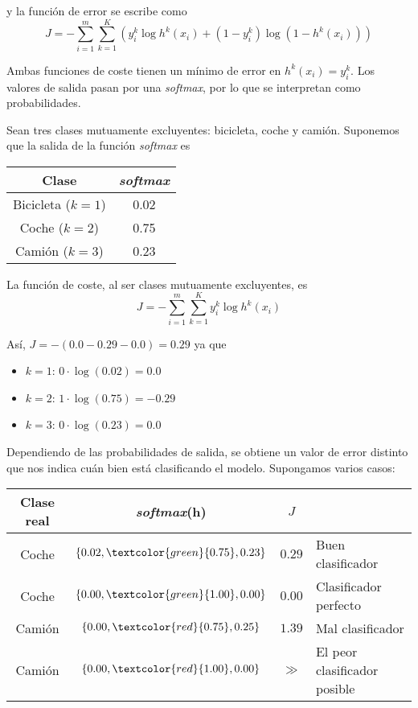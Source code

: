 \noindent y la función de error se escribe como 
\begin{equation}
J = -\sum_{i = 1}^m \sum_{k = 1}^K \left(y_i^k \log h^k(x_i) + (1 - y_i^k) \log (1 - h^k(x_i))\right)
\end{equation}

Ambas funciones de coste tienen un mínimo de error en $h^k(x_i) = y_i^k$. Los valores de salida pasan por una \textit{softmax}, por lo que se interpretan como probabilidades.

\begin{example}
Sean tres clases mutuamente excluyentes: bicicleta, coche y camión. Suponemos que la salida de la función \textit{softmax} es 
\begin{table}[H]
\centering
\begin{tabular}{cc}
\hline \hline
Clase & \textit{softmax} \\ \hline \hline
Bicicleta ($k = 1$) & 0.02 \\
Coche ($k = 2$) & 0.75 \\
Camión ($k = 3$) & 0.23 \\ \hline
\end{tabular}
\end{table}

\noindent La función de coste, al ser clases mutuamente excluyentes, es
\begin{equation}
J = -\sum_{i = 1}^m \sum_{k = 1}^K y_i^k \log h^k(x_i)
\end{equation}

\noindent Así, $J = - (0.0 - 0.29 - 0.0) = 0.29$ ya que  
\begin{itemize}
\item $k = 1$: $0 \cdot \log (0.02) = 0.0$
\item $k = 2$: $1 \cdot \log (0.75) = -0.29$
\item $k = 3$: $0 \cdot \log (0.23) = 0.0$
\end{itemize}

Dependiendo de las probabilidades de salida, se obtiene un valor de error distinto que nos indica cuán bien está clasificando el modelo. Supongamos varios casos:
\begin{table}[H]
\centering
\begin{tabular}{cccl}
\hline \hline
Clase real & \textit{softmax}(h) & $J$ &  \\ \hline \hline
Coche & $\{0.02, \textcolor{green}{0.75}, 0.23\}$ & $0.29$ & Buen clasificador \\
Coche & $\{0.00, \textcolor{green}{1.00}, 0.00\}$ & $0.00$ & Clasificador perfecto \\
Camión & $\{0.00, \textcolor{red}{0.75}, 0.25\}$ & $1.39$ & Mal clasificador \\
Camión & $\{0.00, \textcolor{red}{1.00}, 0.00\}$ & $\gg$ & El peor clasificador posible \\
\end{tabular}
\end{table}
\end{example}